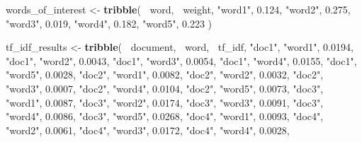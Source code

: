 \documentclass[]{book}
\newenvironment{Shaded}{\begin{snugshade}}{\end{snugshade}}
\newcommand{\FloatTok}[1]{\textcolor[rgb]{0.00,0.00,0.81}{#1}}
\newcommand{\KeywordTok}[1]{\textcolor[rgb]{0.13,0.29,0.53}{\textbf{#1}}}
\newcommand{\NormalTok}[1]{#1}
\newcommand{\OperatorTok}[1]{\textcolor[rgb]{0.81,0.36,0.00}{\textbf{#1}}}
\newcommand{\StringTok}[1]{\textcolor[rgb]{0.31,0.60,0.02}{#1}}
\begin{document}
\begin{Shaded}
\begin{Highlighting}[]
\NormalTok{words_of_interest <-}\StringTok{ }\KeywordTok{tribble}\NormalTok{(}
  \OperatorTok{~}\NormalTok{word, }\OperatorTok{~}\NormalTok{weight,}
  \StringTok{"word1"}\NormalTok{, }\FloatTok{0.124}\NormalTok{,}
  \StringTok{"word2"}\NormalTok{, }\FloatTok{0.275}\NormalTok{,}
  \StringTok{"word3"}\NormalTok{, }\FloatTok{0.019}\NormalTok{,}
  \StringTok{"word4"}\NormalTok{, }\FloatTok{0.182}\NormalTok{,}
  \StringTok{"word5"}\NormalTok{, }\FloatTok{0.223}
\NormalTok{)}

\NormalTok{tf_idf_results <-}\StringTok{ }\KeywordTok{tribble}\NormalTok{(}
  \OperatorTok{~}\NormalTok{document, }\OperatorTok{~}\NormalTok{word, }\OperatorTok{~}\NormalTok{tf_idf,}
  \StringTok{"doc1"}\NormalTok{, }\StringTok{"word1"}\NormalTok{, }\FloatTok{0.0194}\NormalTok{,}
  \StringTok{"doc1"}\NormalTok{, }\StringTok{"word2"}\NormalTok{, }\FloatTok{0.0043}\NormalTok{,}
  \StringTok{"doc1"}\NormalTok{, }\StringTok{"word3"}\NormalTok{, }\FloatTok{0.0054}\NormalTok{,}
  \StringTok{"doc1"}\NormalTok{, }\StringTok{"word4"}\NormalTok{, }\FloatTok{0.0155}\NormalTok{,}
  \StringTok{"doc1"}\NormalTok{, }\StringTok{"word5"}\NormalTok{, }\FloatTok{0.0028}\NormalTok{,}
  \StringTok{"doc2"}\NormalTok{, }\StringTok{"word1"}\NormalTok{, }\FloatTok{0.0082}\NormalTok{,}
  \StringTok{"doc2"}\NormalTok{, }\StringTok{"word2"}\NormalTok{, }\FloatTok{0.0032}\NormalTok{,}
  \StringTok{"doc2"}\NormalTok{, }\StringTok{"word3"}\NormalTok{, }\FloatTok{0.0007}\NormalTok{,}
  \StringTok{"doc2"}\NormalTok{, }\StringTok{"word4"}\NormalTok{, }\FloatTok{0.0104}\NormalTok{,}
  \StringTok{"doc2"}\NormalTok{, }\StringTok{"word5"}\NormalTok{, }\FloatTok{0.0073}\NormalTok{,}
  \StringTok{"doc3"}\NormalTok{, }\StringTok{"word1"}\NormalTok{, }\FloatTok{0.0087}\NormalTok{,}
  \StringTok{"doc3"}\NormalTok{, }\StringTok{"word2"}\NormalTok{, }\FloatTok{0.0174}\NormalTok{,}
  \StringTok{"doc3"}\NormalTok{, }\StringTok{"word3"}\NormalTok{, }\FloatTok{0.0091}\NormalTok{,}
  \StringTok{"doc3"}\NormalTok{, }\StringTok{"word4"}\NormalTok{, }\FloatTok{0.0086}\NormalTok{,}
  \StringTok{"doc3"}\NormalTok{, }\StringTok{"word5"}\NormalTok{, }\FloatTok{0.0268}\NormalTok{,}
  \StringTok{"doc4"}\NormalTok{, }\StringTok{"word1"}\NormalTok{, }\FloatTok{0.0093}\NormalTok{,}
  \StringTok{"doc4"}\NormalTok{, }\StringTok{"word2"}\NormalTok{, }\FloatTok{0.0061}\NormalTok{,}
  \StringTok{"doc4"}\NormalTok{, }\StringTok{"word3"}\NormalTok{, }\FloatTok{0.0172}\NormalTok{,}
  \StringTok{"doc4"}\NormalTok{, }\StringTok{"word4"}\NormalTok{, }\FloatTok{0.0028}\NormalTok{,}

\end{Highlighting}
\end{Shaded}
\end{document}

